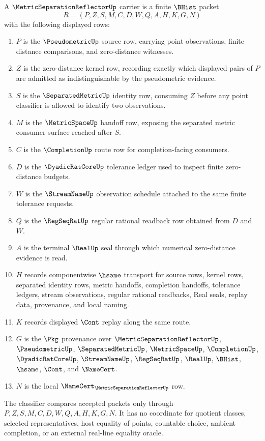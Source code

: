 \begin{definition}
\label{def:metric-separation-reflector-carrier}
A $\MetricSeparationReflectorUp$ carrier is a finite $\BHist$ packet
$$
R=(P,Z,S,M,C,D,W,Q,A,H,K,G,N)
$$
with the following displayed rows:
\begin{enumerate}
\item $P$ is the $\PseudometricUp$ source row, carrying point observations,
finite distance comparisons, and zero-distance witnesses.
\item $Z$ is the zero-distance kernel row, recording exactly which displayed
pairs of $P$ are admitted as indistinguishable by the pseudometric evidence.
\item $S$ is the $\SeparatedMetricUp$ identity row, consuming $Z$ before any
point classifier is allowed to identify two observations.
\item $M$ is the $\MetricSpaceUp$ handoff row, exposing the separated metric
consumer surface reached after $S$.
\item $C$ is the $\CompletionUp$ route row for completion-facing consumers.
\item $D$ is the $\DyadicRatCoreUp$ tolerance ledger used to inspect finite
zero-distance budgets.
\item $W$ is the $\StreamNameUp$ observation schedule attached to the same
finite tolerance requests.
\item $Q$ is the $\RegSeqRatUp$ regular rational readback row obtained from
$D$ and $W$.
\item $A$ is the terminal $\RealUp$ seal through which numerical
zero-distance evidence is read.
\item $H$ records componentwise $\hsame$ transport for source rows, kernel
rows, separated identity rows, metric handoffs, completion handoffs,
tolerance ledgers, stream observations, regular rational readbacks, Real
seals, replay data, provenance, and local naming.
\item $K$ records displayed $\Cont$ replay along the same route.
\item $G$ is the $\Pkg$ provenance over $\MetricSeparationReflectorUp$,
$\PseudometricUp$, $\SeparatedMetricUp$, $\MetricSpaceUp$, $\CompletionUp$,
$\DyadicRatCoreUp$, $\StreamNameUp$, $\RegSeqRatUp$, $\RealUp$, $\BHist$,
$\hsame$, $\Cont$, and $\NameCert$.
\item $N$ is the local $\NameCert_{\MetricSeparationReflectorUp}$ row.
\end{enumerate}
The classifier compares accepted packets only through
$P,Z,S,M,C,D,W,Q,A,H,K,G,N$. It has no coordinate for quotient classes,
selected representatives, host equality of points, countable choice, ambient
completion, or an external real-line equality oracle.
\end{definition}


